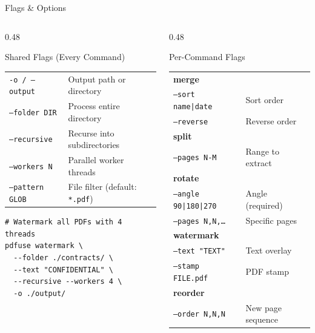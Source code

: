 \documentclass[aspectratio=169]{beamer}
\begin{document}
\begin{frame}[fragile]{Flags \& Options}
  \begin{columns}[T]
    \begin{column}{0.48\textwidth}
      \begin{block}{Shared Flags (Every Command)}
        \small
        \renewcommand{\arraystretch}{1.2}
        \begin{tabular}{ll}
          \texttt{-o / --output}   & Output path or directory \\
          \texttt{--folder DIR}    & Process entire directory \\
          \texttt{--recursive}     & Recurse into subdirectories \\
          \texttt{--workers N}     & Parallel worker threads \\
          \texttt{--pattern GLOB}  & File filter (default: \texttt{*.pdf}) \\
        \end{tabular}
      \end{block}
      \vspace{4pt}
      \begin{lstlisting}
# Watermark all PDFs with 4 threads
pdfuse watermark \
  --folder ./contracts/ \
  --text "CONFIDENTIAL" \
  --recursive --workers 4 \
  -o ./output/
      \end{lstlisting}
    \end{column}
    \begin{column}{0.48\textwidth}
      \begin{block}{Per-Command Flags}
        \small
        \renewcommand{\arraystretch}{1.1}
        \begin{tabular}{ll}
          \multicolumn{2}{l}{\textbf{merge}} \\
          \quad\texttt{--sort name|date} & Sort order \\
          \quad\texttt{--reverse}        & Reverse order \\[2pt]
          \multicolumn{2}{l}{\textbf{split}} \\
          \quad\texttt{--pages N-M}      & Range to extract \\[2pt]
          \multicolumn{2}{l}{\textbf{rotate}} \\
          \quad\texttt{--angle 90|180|270} & Angle (required) \\
          \quad\texttt{--pages N,N,\ldots} & Specific pages \\[2pt]
          \multicolumn{2}{l}{\textbf{watermark}} \\
          \quad\texttt{--text "TEXT"}    & Text overlay \\
          \quad\texttt{--stamp FILE.pdf} & PDF stamp \\[2pt]
          \multicolumn{2}{l}{\textbf{reorder}} \\
          \quad\texttt{--order N,N,N}    & New page sequence \\
        \end{tabular}
      \end{block}
    \end{column}
  \end{columns}
\end{frame}
\end{document}
